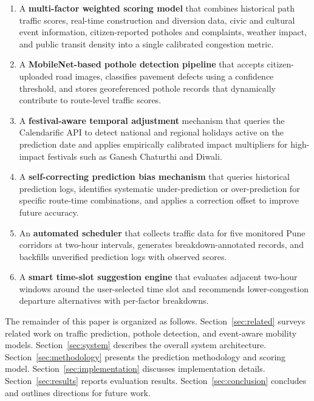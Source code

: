 \documentclass[conference]{IEEEtran}
\begin{document}
\begin{enumerate}
    \item A \textbf{multi-factor weighted scoring model} that combines historical path traffic scores, real-time construction and diversion data, civic and cultural event information, citizen-reported potholes and complaints, weather impact, and public transit density into a single calibrated congestion metric.

    \item A \textbf{MobileNet-based pothole detection pipeline} that accepts citizen-uploaded road images, classifies pavement defects using a confidence threshold, and stores georeferenced pothole records that dynamically contribute to route-level traffic scores.

    \item A \textbf{festival-aware temporal adjustment} mechanism that queries the Calendarific API to detect national and regional holidays active on the prediction date and applies empirically calibrated impact multipliers for high-impact festivals such as Ganesh Chaturthi and Diwali.

    \item A \textbf{self-correcting prediction bias mechanism} that queries historical prediction logs, identifies systematic under-prediction or over-prediction for specific route-time combinations, and applies a correction offset to improve future accuracy.

    \item An \textbf{automated scheduler} that collects traffic data for five monitored Pune corridors at two-hour intervals, generates breakdown-annotated records, and backfills unverified prediction logs with observed scores.

    \item A \textbf{smart time-slot suggestion engine} that evaluates adjacent two-hour windows around the user-selected time slot and recommends lower-congestion departure alternatives with per-factor breakdowns.
\end{enumerate}

The remainder of this paper is organized as follows. Section~\ref{sec:related} surveys related work on traffic prediction, pothole detection, and event-aware mobility models. Section~\ref{sec:system} describes the overall system architecture. Section~\ref{sec:methodology} presents the prediction methodology and scoring model. Section~\ref{sec:implementation} discusses implementation details. Section~\ref{sec:results} reports evaluation results. Section~\ref{sec:conclusion} concludes and outlines directions for future work.
\end{document}
